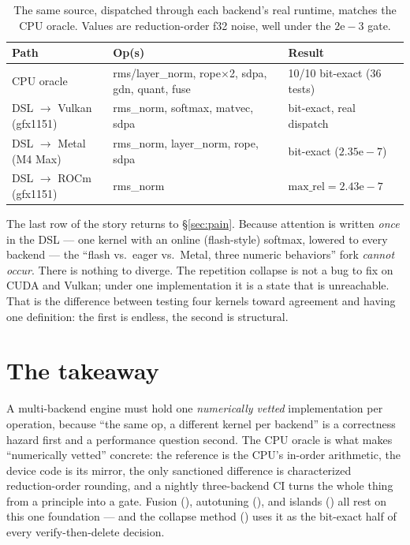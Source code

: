 \documentclass[11pt]{article}
\begin{document}
\begin{table}[h]
\centering\small
\setlength{\tabcolsep}{5pt}
\begin{tabular}{@{}lll@{}}
\toprule
\textbf{Path} & \textbf{Op(s)} & \textbf{Result} \\
\midrule
CPU oracle          & rms/layer\_norm, rope$\times$2, sdpa, gdn, quant, fuse & 10/10 bit-exact (36 tests) \\
DSL $\to$ Vulkan (gfx1151) & rms\_norm, softmax, matvec, sdpa & bit-exact, real dispatch \\
DSL $\to$ Metal (M4 Max)   & rms\_norm, layer\_norm, rope, sdpa & bit-exact ($2.35\mathrm{e}{-}7$) \\
DSL $\to$ ROCm (gfx1151)   & rms\_norm & $\text{max\_rel}=2.43\mathrm{e}{-}7$ \\
\bottomrule
\end{tabular}
\caption{The same source, dispatched through each backend's real runtime, matches the CPU oracle. Values
are reduction-order f32 noise, well under the $2\mathrm{e}{-}3$ gate.}
\label{tab:bitexact}
\end{table}

The last row of the story returns to \S\ref{sec:pain}. Because attention is written \emph{once} in the
DSL --- one  kernel with an online (flash-style) softmax, lowered to every backend --- the
``flash vs.\ eager vs.\ Metal, three numeric behaviors'' fork \emph{cannot occur}. There is nothing to
diverge. The repetition collapse is not a bug to fix on CUDA and Vulkan; under one implementation it is a
state that is unreachable. That is the difference between testing four kernels toward agreement and
having one definition: the first is endless, the second is structural.

\section{The takeaway}

A multi-backend engine must hold one \emph{numerically vetted} implementation per operation, because ``the
same op, a different kernel per backend'' is a correctness hazard first and a performance question second.
The CPU oracle is what makes ``numerically vetted'' concrete: the reference is the CPU's in-order
arithmetic, the device code is its mirror, the only sanctioned difference is characterized
reduction-order rounding, and a nightly three-backend CI turns the whole thing from a principle into a
gate. Fusion (\cite{fuse}), autotuning (\cite{tune}), and islands (\cite{island}) all rest on this one
foundation --- and the collapse method (\cite{method}) uses it as the bit-exact half of every
verify-then-delete decision.
\end{document}
